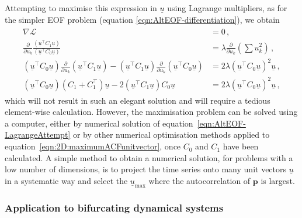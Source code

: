 Attempting to maximise this expression in $\underline{u}$ using Lagrange multipliers, as for the simpler EOF problem (equation \ref{eqn:AltEOF-differentiation}), we obtain
	\begin{align}
	\begin{split}
		\nabla\mathcal{L} &=0\,,\\
		\frac{\partial}{\partial u_k}\frac{\left( \underline{u}^\top C_1\underline{u} \right)}{ \left(\underline{u}^\top C_0 \underline{u}\right)} &=  
		\lambda\frac{\partial}{\partial u_k}\left(\sum u_k^2\right)\,, \\
		\left(\underline{u}^\top C_0 \underline{u}\right)\frac{\partial}{\partial u_k}\left( \underline{u}^\top C_1\underline{u} \right) - \left( \underline{u}^\top C_1\underline{u} \right) \frac{\partial}{\partial u_k}\left( \underline{u}^\top C_0\underline{u} \right) &= 2\lambda \left(\underline{u}^\top C_0 \underline{u}\right)^2\underline{u}\,, \\
		\left(\underline{u}^\top C_0 \underline{u}\right)\left( C_1 + C_1^\top \right)\underline{u} - 2\left( \underline{u}^\top C_1\underline{u} \right) C_0\underline{u} &= 2\lambda \left(\underline{u}^\top C_0 \underline{u}\right)^2\underline{u}\,,
	\end{split}
	\label{eqn:AltEOF-LagrangeAttempt}
	\end{align}
which will not result in such an elegant solution and will require a tedious element-wise calculation. However, the maximisation problem can be solved using a computer, either by numerical solution of equation~\ref{eqn:AltEOF-LagrangeAttempt} or by other numerical optimisation methods applied to equation~\ref{eqn:2D:maximumACFunitvector}, once $C_0$ and $C_1$ have been calculated. A simple method to obtain a numerical solution, for problems with a low number of dimensions, is to project the time series onto many unit vectors $\underline{u}$ in a systematic way and select the $\underline{u}_\text{max}$ where the autocorrelation of $\mathbf{p}$ is largest.

\subsubsection{Application to bifurcating dynamical systems}

